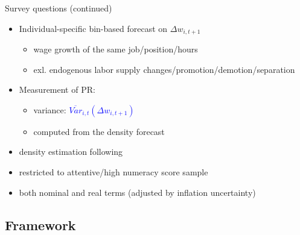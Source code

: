 \documentclass{beamer}
\begin{document}
\begin{frame}{Survey questions (continued)}
	\begin{itemize}
		\item Individual-specific bin-based forecast on $\Delta w_{i,t+1}$
		\begin{itemize}
			\item wage growth of the same job/position/hours
				\item exl. endogenous labor supply changes/promotion/demotion/separation 
		\end{itemize} 
		\item  Measurement of PR: 
		\begin{itemize}
			\item variance: \textcolor{blue}{$\overline {Var}_{i,t}(\Delta w_{i,t+1})$}  
			\item computed from the density forecast
		\end{itemize}
\item density estimation following \cite{engelberg_comparing_2009}			
\item restricted to attentive/high numeracy score sample
\item both nominal and real terms (adjusted by inflation uncertainty)
\end{itemize}
\end{frame}


\subsection{Framework}
\end{document}
